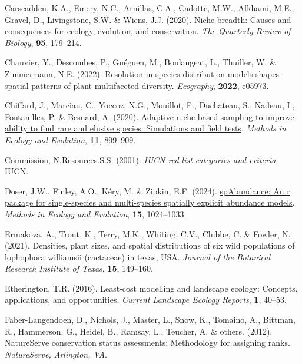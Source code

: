 \documentclass[
]{article}
\newlength{\cslhangindent}
\newlength{\cslentryspacingunit} %
\newenvironment{CSLReferences}[2] %
 {%
  \setlength{\parindent}{0pt}
  \ifodd #1
  \let\oldpar\par
  \def\par{\hangindent=\cslhangindent\oldpar}
  \fi
  \setlength{\parskip}{#2\cslentryspacingunit}
 }%
 {}
\begin{document}
\begin{CSLReferences}{1}{0}
\leavevmode{}%
Carscadden, K.A., Emery, N.C., Arnillas, C.A., Cadotte, M.W., Afkhami,
M.E., Gravel, D., Livingstone, S.W. \& Wiens, J.J. (2020). Niche
breadth: Causes and consequences for ecology, evolution, and
conservation. \emph{The Quarterly Review of Biology}, \textbf{95},
179--214.

\leavevmode{}%
Chauvier, Y., Descombes, P., Guéguen, M., Boulangeat, L., Thuiller, W.
\& Zimmermann, N.E. (2022). Resolution in species distribution models
shapes spatial patterns of plant multifaceted diversity.
\emph{Ecography}, \textbf{2022}, e05973.

\leavevmode{}%
Chiffard, J., Marciau, C., Yoccoz, N.G., Mouillot, F., Duchateau, S.,
Nadeau, I., Fontanilles, P. \& Besnard, A. (2020).
\href{https://doi.org/10.1111/2041-210X.13399}{Adaptive niche-based
sampling to improve ability to find rare and elusive species:
Simulations and field tests}. \emph{Methods in Ecology and Evolution},
\textbf{11}, 899--909.

\leavevmode{}%
Commission, N.Resources.S.S. (2001). \emph{IUCN red list categories and
criteria}. IUCN.

\leavevmode{}%
Doser, J.W., Finley, A.O., Kéry, M. \& Zipkin, E.F. (2024).
\href{https://doi.org/10.1111/2041-210X.14332}{spAbundance: An r package
for single-species and multi-species spatially explicit abundance
models}. \emph{Methods in Ecology and Evolution}, \textbf{15},
1024--1033.

\leavevmode{}%
Ermakova, A., Trout, K., Terry, M.K., Whiting, C.V., Clubbe, C. \&
Fowler, N. (2021). Densities, plant sizes, and spatial distributions of
six wild populations of lophophora williamsii (cactaceae) in texas, USA.
\emph{Journal of the Botanical Research Institute of Texas},
\textbf{15}, 149--160.

\leavevmode{}%
Etherington, T.R. (2016). Least-cost modelling and landscape ecology:
Concepts, applications, and opportunities. \emph{Current Landscape
Ecology Reports}, \textbf{1}, 40--53.

\leavevmode{}%
Faber-Langendoen, D., Nichols, J., Master, L., Snow, K., Tomaino, A.,
Bittman, R., Hammerson, G., Heidel, B., Ramsay, L., Teucher, A. \&
others. (2012). NatureServe conservation status assessments: Methodology
for assigning ranks. \emph{NatureServe, Arlington, VA}.


\end{CSLReferences}
\end{document}
